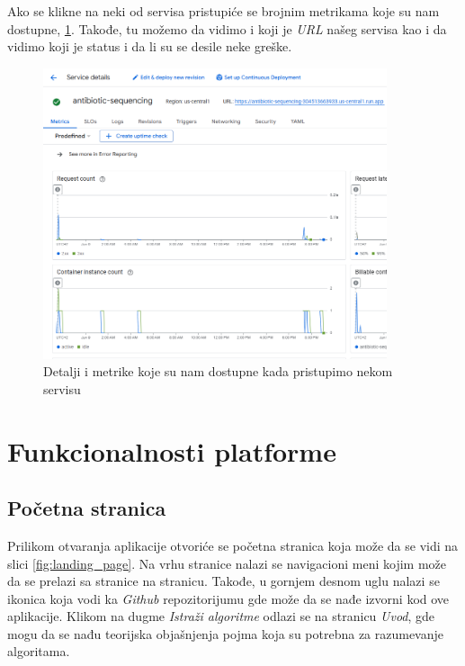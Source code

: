 \documentclass[12pt,oneside]{memoir}
\begin{document}
Ako se klikne na neki od servisa pristupiće se brojnim metrikama koje su nam dostupne, \ref{fig:gcr_services_details}. Takođe, tu možemo da vidimo i koji je \emph{URL} našeg servisa kao i da vidimo koji je status i da li su se desile neke greške.

\begin{figure}[h]
\centering
\includegraphics[width=0.9\textwidth]{images/gcr_services_details.png}
\caption{Detalji i metrike koje su nam dostupne kada pristupimo nekom servisu}
\label{fig:gcr_services_details}
\end{figure}


\section{Funkcionalnosti platforme}

\subsection{Početna stranica}

Prilikom otvaranja aplikacije otvoriće se početna stranica koja može da se vidi na slici \ref{fig:landing_page}. Na vrhu stranice nalazi se navigacioni meni kojim može da se prelazi sa stranice na stranicu. Takođe, u gornjem desnom uglu nalazi se ikonica koja vodi ka \emph{Github} repozitorijumu gde može da se nađe izvorni kod ove aplikacije.
Klikom na dugme \emph{Istraži algoritme} odlazi se na stranicu \emph{Uvod}, gde mogu da se nađu teorijska objašnjenja pojma koja su potrebna za razumevanje algoritama.
\end{document}

